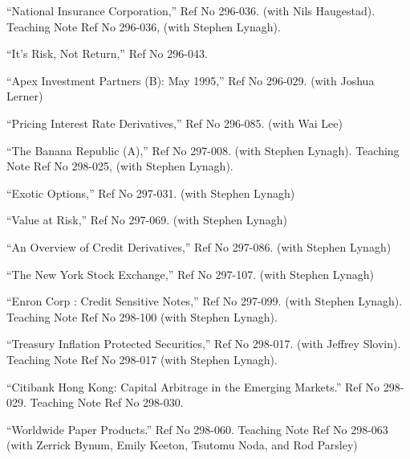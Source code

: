 \documentclass{article}
\begin{document}
\begin{etaremune}
\setlength\itemsep{-0.3em}

\item ``National Insurance Corporation,'' Ref No  296-036.  (with Nils
Haugestad). Teaching Note Ref No 296-036, (with Stephen Lynagh). 
 
\item ``It's Risk, Not Return,'' Ref No  296-043.

\item ``Apex Investment Partners (B): May 1995,'' 
Ref No  296-029. (with Joshua Lerner)

\item ``Pricing Interest Rate Derivatives,'' Ref No 296-085.
(with Wai Lee)

\item ``The Banana Republic (A),'' Ref No  297-008. (with Stephen
Lynagh).  Teaching Note Ref No 298-025, (with Stephen Lynagh).

\item ``Exotic Options,'' Ref No 297-031.
(with Stephen Lynagh)

\item ``Value at Risk,'' Ref No 297-069.
(with Stephen Lynagh)

\item ``An Overview of Credit Derivatives,'' Ref No 297-086.
(with Stephen Lynagh)

\item ``The New York Stock Exchange,'' Ref No 297-107.
(with Stephen Lynagh)

\item ``Enron Corp : Credit Sensitive Notes,'' Ref No 297-099.
(with Stephen Lynagh). Teaching Note Ref No 298-100 (with Stephen Lynagh).

\item ``Treasury Inflation Protected Securities,'' Ref No 298-017. (with
Jeffrey Slovin). Teaching Note Ref No 298-017 (with Stephen Lynagh).  

\item ``Citibank Hong Kong: Capital Arbitrage in the Emerging Markets.''
Ref No 298-029. Teaching Note Ref No 298-030.

\item ``Worldwide Paper Products.'' Ref No 298-060. 
Teaching Note Ref No 298-063 (with Zerrick Bynum, Emily Keeton,
Tsutomu Noda, and Rod Parsley)
 
\end{etaremune}
\end{document}

